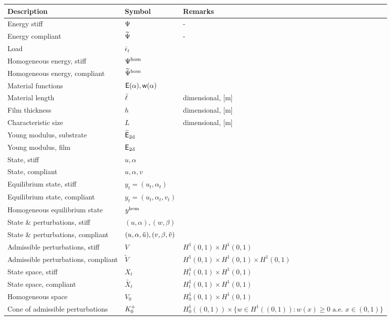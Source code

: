 \documentclass[10pt]{article}
\begin{document}
%
%

\begin{table}[h!]
  \centering
  \begin{tabular}{  m{5.5cm}  m{3cm}  m{6cm}  }
    \hline
    \textbf{Description} & \textbf{Symbol} & \textbf{Remarks} \\
    \hline
    Energy stiff     & $\Psi$ & - \\
    Energy compliant & $\widetilde\Psi$ & - \\
    Load & $\bar\epsilon_t$ & \\
    Homogeneous energy, stiff   & $\Psi^\text{hom}$ & \\
    Homogeneous energy, compliant   & $\widetilde\Psi^\text{hom}$ & \\
    Material functions &  $\mathsf E(\alpha), \mathsf{w}(\alpha)$ & \\
    Material length & $\bar{\ell}$ & dimensional, [m]\\
    Film thickness & $h$ & dimensional, [m]\\
    Characteristic size & $L$ & dimensional, [m]\\
    Young modulus, substrate & ${\mathsf{\widetilde E_{\text{2d}}}}$ & \\
    Young modulus, film & $\mathsf{E_{\text{2d}}}$ & \\
    State, stiff& $u, \alpha$ & \\
    State, compliant& $u, \alpha, v$ & \\
    Equilibrium state, stiff& $y_t=(u_t, \alpha_t)$ & \\
    Equilibrium state, compliant & $y_t=(u_t, \alpha_t, v_t)$ & \\
    Homogeneous equilibrium state  & $y^{\text{hom}}$ & \\
    State \& perturbations, stiff & $(u,\alpha), (w, \beta)$ & \\
    State \& perturbations, compliant & $(u, \alpha, \tilde u), (v, \beta, \tilde v)$ & \\
    Admissible perturbations, stiff& $V$ & $H^1(0,1)\times  H^1(0,1)$\\
    Admissible perturbations, compliant& $\widetilde{V}$ & $H^1(0,1)\times  H^1(0,1)\times  H^1(0,1)$\\
    State space, stiff& $X_t$ & $H^1_t(0,1)\times  H^1(0,1)$\\
    State space, compliant& $\widetilde{X_t}$ & $H^1_t(0,1)\times  H^1(0,1)$\\
    Homogeneous space& $V_0$ & $H^1_0(0,1)\times  H^1(0,1)$\\
    Cone of admissible perturbations& $K^+_{0}$ & $H^1_0((0, 1))\times \{w \in H^1((0, 1)): w(x) \geq 0 \text{ a.e. }x\in (0, 1)\}$\\

\end{tabular}
\end{table}
\end{document}
